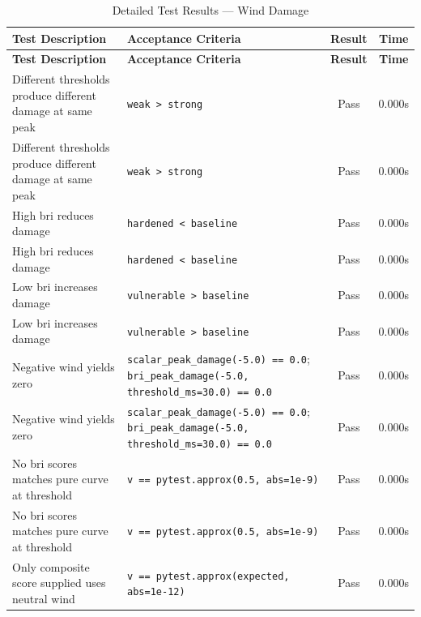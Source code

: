 \documentclass[11pt,a4paper]{article}
\begin{document}
\begin{longtable}{p{6cm}p{5.5cm}cc}
    \caption{Detailed Test Results --- Wind Damage} \\
    \label{tab:test_detail_mkm_wd_001}
    \toprule
    \textbf{Test Description} & \textbf{Acceptance Criteria} & \textbf{Result} & \textbf{Time} \\
    \midrule
    \endfirsthead
    \toprule
    \textbf{Test Description} & \textbf{Acceptance Criteria} & \textbf{Result} & \textbf{Time} \\
    \midrule
    \endhead
    \bottomrule
    \endfoot
    Different thresholds produce different damage at same peak & {\scriptsize \texttt{weak > strong}} & \textcolor{green!60!black}{Pass} & 0.000s \\
    Different thresholds produce different damage at same peak & {\scriptsize \texttt{weak > strong}} & \textcolor{green!60!black}{Pass} & 0.000s \\
    High bri reduces damage & {\scriptsize \texttt{hardened < baseline}} & \textcolor{green!60!black}{Pass} & 0.000s \\
    High bri reduces damage & {\scriptsize \texttt{hardened < baseline}} & \textcolor{green!60!black}{Pass} & 0.000s \\
    Low bri increases damage & {\scriptsize \texttt{vulnerable > baseline}} & \textcolor{green!60!black}{Pass} & 0.000s \\
    Low bri increases damage & {\scriptsize \texttt{vulnerable > baseline}} & \textcolor{green!60!black}{Pass} & 0.000s \\
    Negative wind yields zero & {\scriptsize \texttt{scalar\_peak\_damage(-5.0) == 0.0}; \texttt{bri\_peak\_damage(-5.0, threshold\_ms=30.0) == 0.0}} & \textcolor{green!60!black}{Pass} & 0.000s \\
    Negative wind yields zero & {\scriptsize \texttt{scalar\_peak\_damage(-5.0) == 0.0}; \texttt{bri\_peak\_damage(-5.0, threshold\_ms=30.0) == 0.0}} & \textcolor{green!60!black}{Pass} & 0.000s \\
    No bri scores matches pure curve at threshold & {\scriptsize \texttt{v == pytest.approx(0.5, abs=1e-9)}} & \textcolor{green!60!black}{Pass} & 0.000s \\
    No bri scores matches pure curve at threshold & {\scriptsize \texttt{v == pytest.approx(0.5, abs=1e-9)}} & \textcolor{green!60!black}{Pass} & 0.000s \\
    Only composite score supplied uses neutral wind & {\scriptsize \texttt{v == pytest.approx(expected, abs=1e-12)}} & \textcolor{green!60!black}{Pass} & 0.000s \\

\end{longtable}
\end{document}
